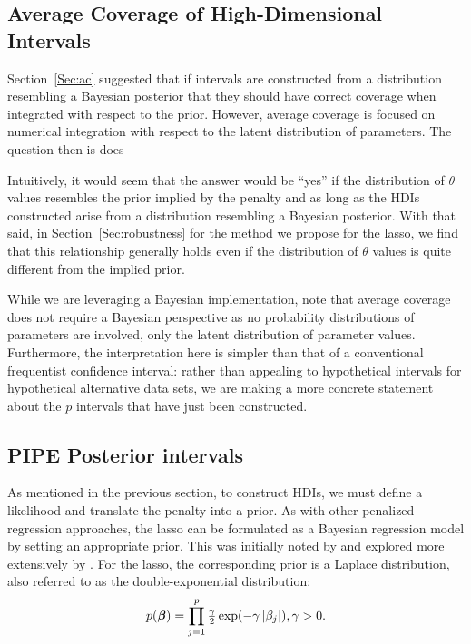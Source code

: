 \subsection{Average Coverage of High-Dimensional Intervals}
\label{sec:ac-hdi}

Section~\ref{Sec:ac} suggested that if intervals are constructed from a distribution resembling a Bayesian posterior that they should have correct coverage when integrated with respect to the prior. However, average coverage is focused on numerical integration with respect to the latent distribution of parameters. The question then is does

Intuitively, it would seem that the answer would be ``yes'' if the distribution of $\theta$ values resembles the prior implied by the penalty and as long as the HDIs constructed arise from a distribution resembling a Bayesian posterior. With that said, in Section~\ref{Sec:robustness} for the method we propose for the lasso, we find that this relationship generally holds even if the distribution of $\theta$ values is quite different from the implied prior.

While we are leveraging a Bayesian implementation, note that average coverage does not require a Bayesian perspective as no probability distributions of parameters are involved, only the latent distribution of parameter values. Furthermore, the interpretation here is simpler than that of a conventional frequentist confidence interval: rather than appealing to hypothetical intervals for hypothetical alternative data sets, we are making a more concrete statement about the  $p$ intervals that have just been constructed.

\subsection{PIPE Posterior intervals}\label{Sec:methods}

As mentioned in the previous section, to construct HDIs, we must define a likelihood and translate the penalty into a prior. As with other penalized regression approaches, the lasso can be formulated as a Bayesian regression model by setting an appropriate prior. This was initially noted by \citet{Tibshirani1996} and explored more extensively by \citet{Park2008}. For the lasso, the corresponding prior is a Laplace distribution, also referred to as the double-exponential distribution:
$$ p(\boldsymbol{\beta}) = \prod_{j = 1}^{p} \tfrac{\gamma}{2}\exp(-\gamma \left\lvert\beta_j\right\rvert), \gamma > 0. $$


